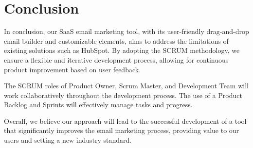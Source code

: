 \section*{Conclusion}

In conclusion, our SaaS email marketing tool, with its user-friendly drag-and-drop email builder and customizable elements, aims to address the limitations of existing solutions such as HubSpot. By adopting the SCRUM methodology, we ensure a flexible and iterative development process, allowing for continuous product improvement based on user feedback.

\vspace{5pt}

The SCRUM roles of Product Owner, Scrum Master, and Development Team will work collaboratively throughout the development process. The use of a Product Backlog and Sprints will effectively manage tasks and progress.

\vspace{5pt}

Overall, we believe our approach will lead to the successful development of a tool that significantly improves the email marketing process, providing value to our users and setting a new industry standard.

